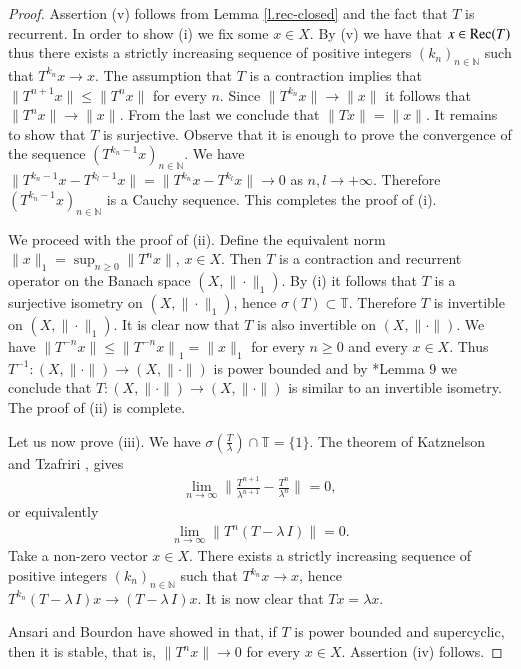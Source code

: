\documentclass[12pt,leqno]{amsart}
\theoremstyle{plain}
\theoremstyle{definition}
\numberwithin{equation}{section}
\begin{document}
\begin{proof}
	Assertion (v) follows from Lemma \ref{l.rec-closed} and the fact that $T$ is recurrent. In order to show (i) we fix some $x\in X$. By (v) we have that $x\in{\textnormal{Rec}}(T)$ thus there exists a strictly increasing sequence of positive integers $(k_n)_{n\in\mathbb N}$ such that $T^{k_n}x\to x$. The assumption that $T$ is a contraction implies that $\| T^{n+1}x\|\leq \| T^nx\|$ for every $n$. Since $\| T^{k_n}x\| \to \| x\|$ it follows that $\| T^nx\| \to \| x\|$. From the last we conclude that $\| Tx\|=\| x\|$. It remains to show that $T$ is surjective. Observe that it is enough to prove the convergence of the sequence $(T^{k_n-1}x)_{n\in\mathbb N}$. We have $\| T^{k_n-1}x - T^{k_l-1}x\|=\| T^{k_n}x - T^{k_l}x\|\to 0$ as $n,l\to +\infty$. Therefore $( T^{k_n-1}x)_{n\in\mathbb N}$ is a Cauchy sequence. This completes the proof of (i).
	
	We proceed with the proof of (ii). Define the equivalent norm $\| x \|_1 =\sup_{n\geq 0} \| T^nx\|$, $x\in X$. Then $T$ is a contraction and recurrent operator on the Banach space $(X,\| \cdot \|_1)$. By (i) it follows that $T$ is a surjective isometry on $(X,\| \cdot \|_1)$, hence $\sigma (T)\subset \mathbb T$. Therefore $T$ is invertible on $(X,\| \cdot \|_1)$. It is clear now that $T$ is also invertible on $(X, \| \cdot \| )$. We have $ \| T^{-n}x \| \leq {\| T^{-n}x\|}_1=\| x\|_1$ for every $ n\geq 0 $ and every $x\in X$. Thus $T^{-1}: (X,\| \cdot \| ) \to (X,\| \cdot \| )$ is power bounded and by \cite{DriMbe}*{Lemma 9} we conclude that $T: (X,\| \cdot \| ) \to (X,\| \cdot \| )$ is similar to an invertible isometry. The proof of (ii) is complete.
	
	Let us now prove (iii). We have $\sigma (\frac{T}{\lambda})\cap \mathbb T= \{ 1\}$. The theorem of Katznelson and Tzafriri \cite{KaTza}, gives 
	\begin{align*}
		\lim_{n\to\infty} {\biggl\lVert\frac{T^{n+1}}{\lambda^{n+1}}-\frac{T^n}{\lambda^n} \biggr\rVert_{}}=0, 
	\end{align*}
	or equivalently 
	\begin{align*}
		\lim_{n\to\infty} \| T^n(T-\lambda\, I) \| =0. 
	\end{align*}
	Take a non-zero vector $x\in X$. There exists a strictly increasing sequence of positive integers $(k_n)_{n\in\mathbb N}$  such that $T^{k_n}x\to x$, hence $T^{k_n}(T-\lambda\, I)x\to (T-\lambda\, I)x$. It is now clear that $Tx=\lambda x$.
	
	 Ansari and Bourdon have showed in \cite{AB} that, if $T$ is power bounded and supercyclic, then it is stable, that is, $\| T^n x \| \to 0$ for every $x\in X$. Assertion (iv) follows.
	\end{proof}
\end{document}
